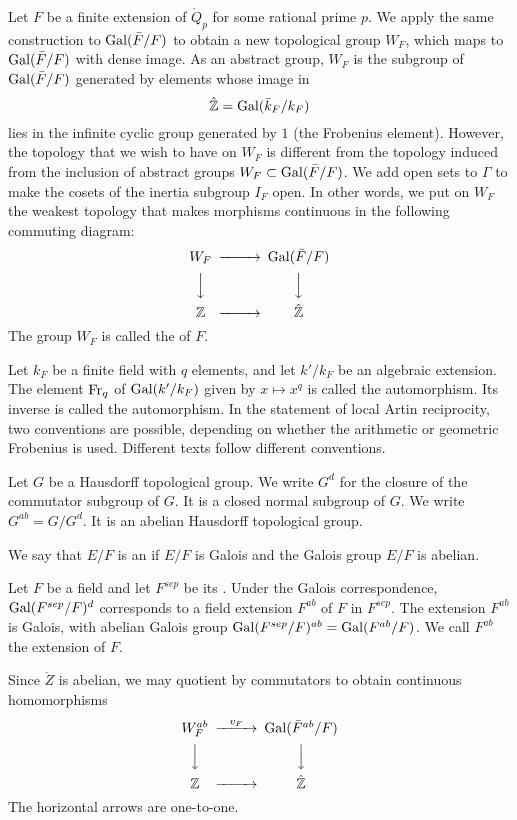 \documentclass{amsart}
\def\oG{\op{Gal}}
\begin{document}
Let $F$ be a finite extension of $\ring{Q}_p$ for some rational prime $p$.
We apply the same construction to $\oG(\bar F/F)$ to obtain a 
new topological group $W_F$, which maps to $\oG(\bar F/F)$ with dense
image.  As an abstract group, $W_F$ is the subgroup of $\oG(\bar F/F)$
generated by elements whose image in
\[
\hat{\ring{Z}} = \oG(\bar k_F/k_F)
\]
lies in the infinite cyclic group generated by $1$ (the Frobenius element).
However, the topology that we wish to have on $W_F$ is different from the
topology induced from the inclusion of abstract groups $W_F\subset \oG(\bar F/F)$.
We add open sets to $\Gamma$ to make the cosets of the inertia subgroup $I_F$
open.  In other words, we put on $W_F$ the weakest topology that makes 
morphisms continuous in the following commuting diagram:
\[
\begin{CD}
W_F @>>> \oG(\bar F/F)\\
@VVV @VVV\\
\ring{Z} @>>> \hat{\ring{Z}}\\
\end{CD}
\]
The group $W_F$ is called the  of $F$.


Let $k_F$ be a finite field with $q$ elements, and let $k'/k_F$ be an
algebraic extension.  The element ${\operatorname{Fr}}_q$ of $\oG(k'/k_F)$
given by $x\mapsto x^q$ is called the 
automorphism.  Its inverse is called the 
automorphism.  In the statement of local Artin reciprocity, two
conventions are possible, depending on whether the arithmetic
or geometric Frobenius is used.  Different texts follow different conventions.

Let $G$ be a Hausdorff topological group.  We write $G^d$ for the closure of
the commutator subgroup of $G$.  It is a closed normal subgroup of $G$.
We write $G^{ab} = G/G^d$.  It is an abelian Hausdorff topological group.

We say that  $E/F$ is an  if $E/F$ is Galois and
the Galois group $E/F$ is abelian.

Let $F$ be a field and let $F^{sep}$ be its .
Under the Galois correspondence, $\oG(F^{sep}/F)^d$ corresponds to
a field extension $F^{ab}$ of $F$ in $F^{sep}$.  The extension $F^{ab}$ is
Galois, with abelian Galois group $\oG(F^{sep}/F)^{ab} = \oG(F^{ab}/F)$.
We call $F^{ab}$ the  extension of $F$.

Since $\ring{Z}$ is abelian, we may quotient by commutators to obtain
continuous homomorphisms
\[
\begin{CD}
W^{ab}_F @>v_F>> \oG(\bar F^{ab}/F)\\
@VVV @VVV\\
\ring{Z} @>>> \hat{\ring{Z}}\\
\end{CD}
\]
The horizontal arrows are one-to-one.
\end{document}
